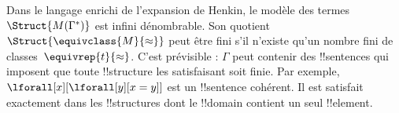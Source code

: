 \documentclass[../../../include/open-logic-section]{subfiles}
\begin{document}
\begin{digress}
Dans le langage enrichi de l'expansion de Henkin, le modèle des
termes $\Struct{M(\Gamma^*)}$ est infini dénombrable. Son quotient
$\Struct{\equivclass{M}{\approx}}$ peut être fini s'il n'existe
qu'un nombre fini de classes~$\equivrep{t}{\approx}$. C'est
prévisible : $\Gamma$ peut contenir des !!{sentence}s qui imposent
que toute !!{structure} les satisfaisant soit finie. Par exemple,
$\lforall[x][\lforall[y][x=y]]$ est un !!{sentence} cohérent.
Il est satisfait exactement dans les !!{structure}s dont le
!!{domain} contient un seul !!{element}.
\end{digress}
\end{document}
